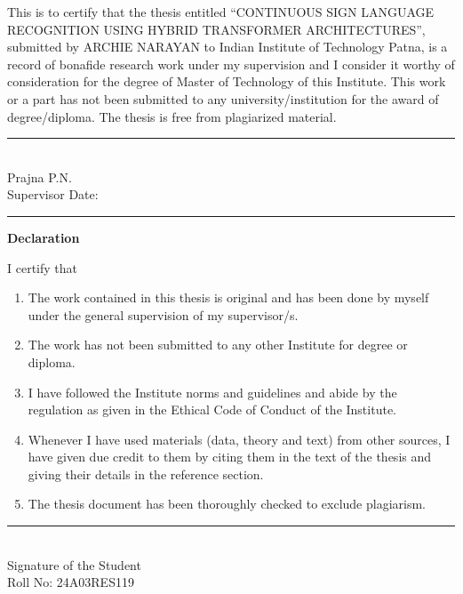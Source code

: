 \noindent This is to certify that the thesis entitled ``CONTINUOUS SIGN LANGUAGE RECOGNITION USING HYBRID TRANSFORMER ARCHITECTURES'', submitted by ARCHIE NARAYAN to Indian Institute of Technology Patna, is a record of bonafide research work under my supervision and I consider it worthy of consideration for the degree of Master of Technology of this Institute. This work or a part has not been submitted to any university/institution for the award of degree/diploma. The thesis is free from plagiarized material.

\vspace{3cm}

\noindent \rule{5cm}{0.4pt} \\
Prajna P.N. \\
Supervisor \hfill Date: \rule{3cm}{0.4pt}

\clearpage

\begin{center}
\textbf{Declaration}
\end{center}
\vspace{1cm}

\noindent I certify that
\begin{enumerate}
    \item[a.] The work contained in this thesis is original and has been done by myself under the general supervision of my supervisor/s.
    \item[b.] The work has not been submitted to any other Institute for degree or diploma.
    \item[c.] I have followed the Institute norms and guidelines and abide by the regulation as given in the Ethical Code of Conduct of the Institute.
    \item[d.] Whenever I have used materials (data, theory and text) from other sources, I have given due credit to them by citing them in the text of the thesis and giving their details in the reference section.
    \item[e.] The thesis document has been thoroughly checked to exclude plagiarism.
\end{enumerate}

\vspace{3cm}

\noindent \rule{5cm}{0.4pt} \\
Signature of the Student \\
Roll No: 24A03RES119

